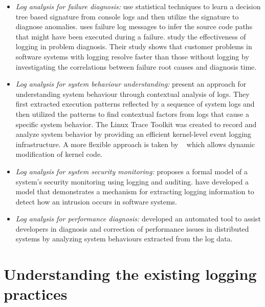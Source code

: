 \begin{itemize} [leftmargin=0.5in]
\item \emph{Log analysis for failure diagnosis:} \citet{xu2009detecting} use statistical techniques to learn a decision tree based signature from console logs and then utilize the signature to diagnose anomalies.  \cite{yuan2010sherlog} uses failure log messages to infer the source code paths that might have been executed during a failure. \citet{jiang2009understanding} study the effectiveness of logging in problem diagnosis. Their study shows that customer problems in software systems with logging resolve faster than those without logging by investigating the correlations between failure root causes and diagnosis time.
\item \emph{Log analysis for system behaviour understanding:} \citet{fu2013contextual} present an approach for understanding system behaviour through contextual analysis of logs. They first extracted execution patterns reflected by a sequence of system logs and then utilized the patterns to find contextual factors from logs that cause a specific system behavior. The Linux Trace Toolkit \cite{yaghmour2000measuringandcharacter} was created to record and analyze system behavior by providing an efficient kernel-level event logging infrastructure. A more flexible approach is taken by ~\cite{cantrill2004dynamic} which allows dynamic modification of kernel code.
\item \emph{Log analysis for system security monitoring:} \citet{bishop1989model} proposes a formal model of a system's security monitoring using logging and auditing. \citet{peisert2007toward} have developed a model that demonstrates a mechanism for extracting logging information to detect how an intrusion occurs in software systems.
\item \emph{Log analysis for performance diagnosis:} \citet{nagaraj2012structured} developed an automated tool to assist developers in diagnosis and correction of performance issues in distributed systems by analyzing system behaviours extracted from the log data.
\end{itemize}



\section{Understanding the existing logging practices}  \label{understand-logging}

